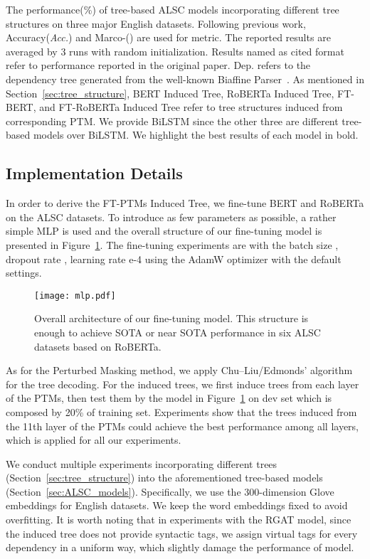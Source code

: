 \documentclass[11pt]{article}
\begin{document}
\begin{table*}[t]
  \caption{The  performance(\%)  of tree-based ALSC models incorporating different tree structures on three major English datasets.  Following previous work, Accuracy(\textit{Acc.}) and Marco-(\textit{}) are used for metric. The reported results are averaged by 3 runs with random initialization. Results named as cited format refer to performance reported in the original paper. Dep. refers to the dependency tree generated from the well-known Biaffine Parser~\citep{DBLP:conf/iclr/DozatM17}. As mentioned in Section~\ref{sec:tree_structure}, BERT Induced Tree, RoBERTa Induced Tree, FT-BERT, and FT-RoBERTa Induced Tree refer to tree structures induced from corresponding PTM. We provide BiLSTM since the other three are different tree-based models over BiLSTM. We highlight the best results of each model in bold.}
  \label{tb:eng}
\end{table*}
\subsection{Implementation Details}
In order to derive the FT-PTMs Induced Tree, we  fine-tune BERT and RoBERTa on the ALSC datasets.  To introduce as few parameters as possible, a rather simple MLP is used and the overall structure of our fine-tuning model is presented in Figure~\ref{fig:model_structure}. The fine-tuning experiments are with the batch size , dropout rate , learning rate e-4 using the AdamW optimizer with the default settings.


\begin{figure}[]
  \texttt{[image: mlp.pdf]}
  \caption{Overall architecture of our fine-tuning model. This structure is enough to achieve SOTA or near SOTA performance in six ALSC datasets  based on RoBERTa.}\label{fig:model_structure}
\end{figure}
As for the Perturbed Masking method, we apply Chu–Liu/Edmonds' algorithm  for the tree decoding. For the induced trees, we first  induce trees from each layer of the PTMs, then test them by the  model in Figure~\ref{fig:model_structure} on dev set which is composed by 20\% of training set. Experiments show that the trees induced from the 11th layer of the PTMs could achieve the best performance among all layers, which is applied for  all  our experiments.

We conduct multiple experiments incorporating different trees (Section~\ref{sec:tree_structure}) into the aforementioned tree-based models (Section~\ref{sec:ALSC_models}). Specifically, we use the 300-dimension Glove~\citep{DBLP:conf/emnlp/PenningtonSM14} embeddings for English datasets.
We keep the word embeddings fixed to avoid overfitting. It is worth noting that in experiments with the RGAT model, since the induced tree does not provide syntactic tags, we assign virtual tags for every dependency in a uniform way, which slightly damage the performance of model.
\end{document}

